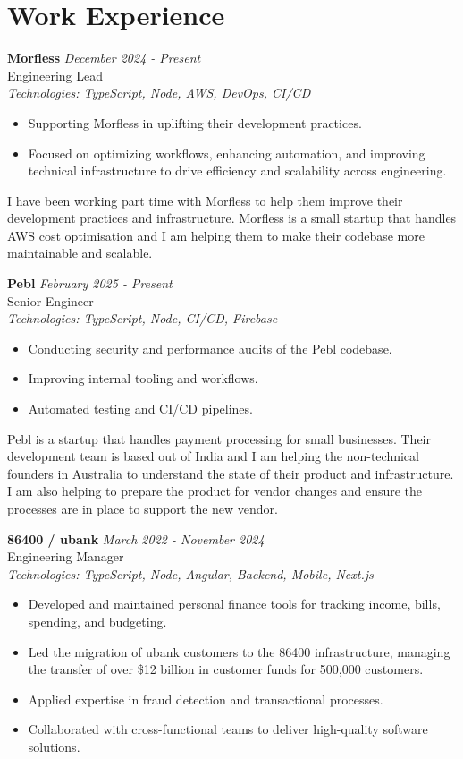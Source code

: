 \documentclass[a4paper,10pt]{article}
\begin{document}
\section*{Work Experience}

\textbf{Morfless} \hfill \textit{December 2024 - Present} \\
Engineering Lead \\
\textit{Technologies: TypeScript, Node, AWS, DevOps, CI/CD}
\begin{itemize}
    \item Supporting Morfless in uplifting their development practices.
    \item Focused on optimizing workflows, enhancing automation, and improving technical infrastructure to drive efficiency and scalability across engineering.
\end{itemize}

I have been working part time with Morfless to help them improve their development practices and infrastructure. 
Morfless is a small startup that handles AWS cost optimisation and 
I am helping them to make their codebase more maintainable and scalable.

\textbf{Pebl} \hfill \textit{February 2025 - Present} \\
Senior Engineer \\
\textit{Technologies: TypeScript, Node, CI/CD, Firebase}
\begin{itemize}
    \item Conducting security and performance audits of the Pebl codebase.
    \item Improving internal tooling and workflows.
    \item Automated testing and CI/CD pipelines.
\end{itemize}

Pebl is a startup that handles payment processing for small businesses. 
Their development team is based out of India and I am helping the non-technical founders in Australia to understand
the state of their product and infrastructure. I am also helping to prepare the product for vendor changes and ensure 
the processes are in place to support the new vendor.

\textbf{86400 / ubank} \hfill \textit{March 2022 - November 2024} \\
Engineering Manager \\
\textit{Technologies: TypeScript, Node, Angular, Backend, Mobile, Next.js}
\begin{itemize}
    \item Developed and maintained personal finance tools for tracking income, bills, spending, and budgeting.
    \item Led the migration of ubank customers to the 86400 infrastructure, managing the transfer of over \$12 billion in customer funds for 500,000 customers.
    \item Applied expertise in fraud detection and transactional processes.
    \item Collaborated with cross-functional teams to deliver high-quality software solutions.
\end{itemize}
\end{document}
